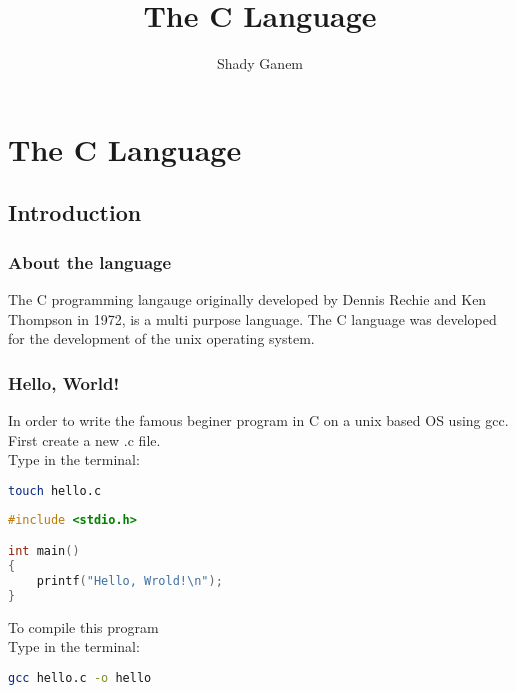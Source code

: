 \documentclass{book}
\title{The C Language}
\author{Shady Ganem}
\begin{document}
\maketitle
\tableofcontents
{}

\part{The C Language}
\chapter{Introduction}
\section{About the language}
The C programming langauge originally developed by Dennis Rechie and Ken Thompson in 1972, 
is a multi purpose language. The C language was developed for the development of the unix operating system.
\section{Hello, World!}
In order to write the famous beginer program in C on a unix based OS using gcc.\\
First create a new .c file. \\
Type in the terminal:
\begin{lstlisting}[language=bash]
touch hello.c
\end{lstlisting}
\begin{lstlisting}[language=C]
#include <stdio.h>

int main()
{
    printf("Hello, Wrold!\n");
}
\end{lstlisting}
To compile this program\\
Type in the terminal:
\begin{lstlisting}[language=bash]
gcc hello.c -o hello
\end{lstlisting}
\end{document}

